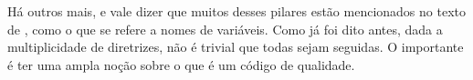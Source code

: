 Há outros mais, e vale dizer que muitos desses pilares estão mencionados no texto de \cite{CCL}, como o que
se refere a nomes de variáveis.
Como já foi dito antes, dada a multiplicidade de diretrizes, não é trivial que todas sejam seguidas.
O importante é ter uma ampla noção sobre o que é um código de qualidade.